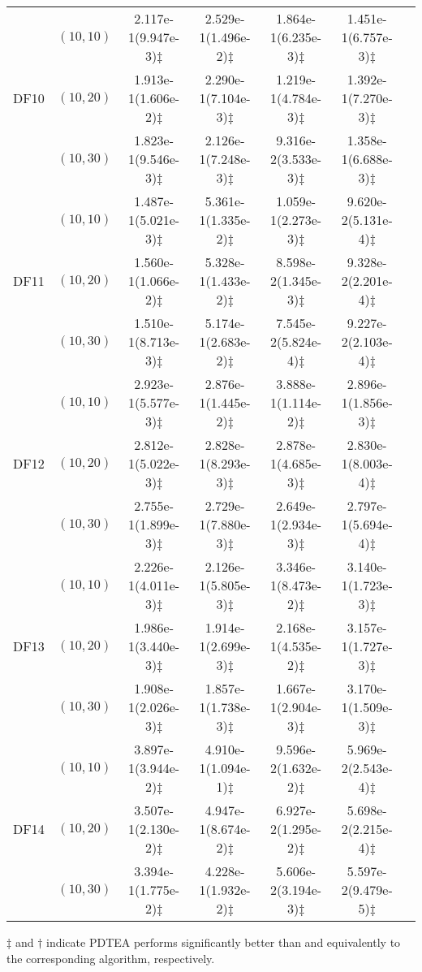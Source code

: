 \documentclass[review]{elsarticle}
\begin{document}
\begin{table*}[!tbh]
{{\begin{tabular} {ccccccc}
\hline  \multirow{3}{*}{DF10}
&$(10,10)$ &2.117e-1(9.947e-3)$\ddagger$ &2.529e-1(1.496e-2)$\ddagger$ &1.864e-1(6.235e-3)$\ddagger$ &1.451e-1(6.757e-3)$\ddagger$ \\
&$(10,20)$ &1.913e-1(1.606e-2)$\ddagger$ &2.290e-1(7.104e-3)$\ddagger$ &1.219e-1(4.784e-3)$\ddagger$ &1.392e-1(7.270e-3)$\ddagger$ \\
&$(10,30)$ &1.823e-1(9.546e-3)$\ddagger$ &2.126e-1(7.248e-3)$\ddagger$ &9.316e-2(3.533e-3)$\ddagger$ &1.358e-1(6.688e-3)$\ddagger$ \\
\hline  \multirow{3}{*}{DF11}
&$(10,10)$ &1.487e-1(5.021e-3)$\ddagger$ &5.361e-1(1.335e-2)$\ddagger$ &1.059e-1(2.273e-3)$\ddagger$ &9.620e-2(5.131e-4)$\ddagger$ \\
&$(10,20)$ &1.560e-1(1.066e-2)$\ddagger$ &5.328e-1(1.433e-2)$\ddagger$ &8.598e-2(1.345e-3)$\ddagger$ &9.328e-2(2.201e-4)$\ddagger$ \\
&$(10,30)$ &1.510e-1(8.713e-3)$\ddagger$ &5.174e-1(2.683e-2)$\ddagger$ &7.545e-2(5.824e-4)$\ddagger$ &9.227e-2(2.103e-4)$\ddagger$ \\
\hline  \multirow{3}{*}{DF12}
&$(10,10)$ &2.923e-1(5.577e-3)$\ddagger$ &2.876e-1(1.445e-2)$\ddagger$ &3.888e-1(1.114e-2)$\ddagger$ &2.896e-1(1.856e-3)$\ddagger$ \\
&$(10,20)$ &2.812e-1(5.022e-3)$\ddagger$ &2.828e-1(8.293e-3)$\ddagger$ &2.878e-1(4.685e-3)$\ddagger$ &2.830e-1(8.003e-4)$\ddagger$ \\
&$(10,30)$ &2.755e-1(1.899e-3)$\ddagger$ &2.729e-1(7.880e-3)$\ddagger$ &2.649e-1(2.934e-3)$\ddagger$ &2.797e-1(5.694e-4)$\ddagger$ \\
\hline  \multirow{3}{*}{DF13}
&$(10,10)$ &2.226e-1(4.011e-3)$\ddagger$ &2.126e-1(5.805e-3)$\ddagger$ &3.346e-1(8.473e-2)$\ddagger$ &3.140e-1(1.723e-3)$\ddagger$ \\
&$(10,20)$ &1.986e-1(3.440e-3)$\ddagger$ &1.914e-1(2.699e-3)$\ddagger$ &2.168e-1(4.535e-2)$\ddagger$ &3.157e-1(1.727e-3)$\ddagger$ \\
&$(10,30)$ &1.908e-1(2.026e-3)$\ddagger$ &1.857e-1(1.738e-3)$\ddagger$ &1.667e-1(2.904e-3)$\ddagger$ &3.170e-1(1.509e-3)$\ddagger$ \\
\hline  \multirow{3}{*}{DF14}
&$(10,10)$ &3.897e-1(3.944e-2)$\ddagger$ &4.910e-1(1.094e-1)$\ddagger$ &9.596e-2(1.632e-2)$\ddagger$ &5.969e-2(2.543e-4)$\ddagger$ \\
&$(10,20)$ &3.507e-1(2.130e-2)$\ddagger$ &4.947e-1(8.674e-2)$\ddagger$ &6.927e-2(1.295e-2)$\ddagger$ &5.698e-2(2.215e-4)$\ddagger$ \\
&$(10,30)$ &3.394e-1(1.775e-2)$\ddagger$ &4.228e-1(1.932e-2)$\ddagger$ &5.606e-2(3.194e-3)$\ddagger$ &5.597e-2(9.479e-5)$\ddagger$ \\
\midrule
\bottomrule[1pt]
\end{tabular}}
}
\begin{tablenotes}
\item $\ddagger$ and $ \dagger$ indicate PDTEA performs significantly better than and equivalently to the corresponding algorithm, respectively.
\end{tablenotes}
\scriptsize
\end{table*}
\end{document}
